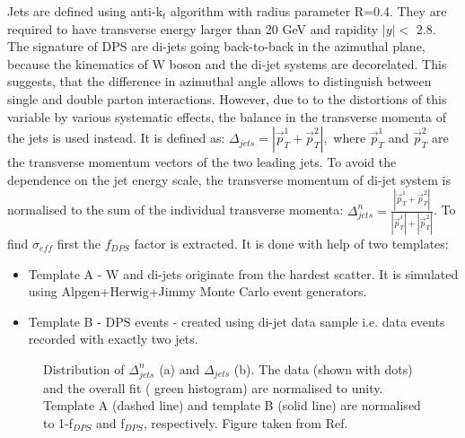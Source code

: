 \documentclass{ws-rv9x6}
\begin{document}
Jets are defined using anti-k$_t$ algorithm with radius parameter R=0.4. They are required to have transverse energy larger than 20 GeV and rapidity $|y| < $ 2.8. 
The signature of DPS are di-jets going back-to-back in the azimuthal plane, because the kinematics of W boson and the di-jet systems are decorelated. This suggests, that  the difference in azimuthal angle allows to distinguish between single and double parton interactions. However, due to to the distortions of this variable by various systematic effects, the balance in the transverse momenta of the jets is used instead. 
It is defined as:
$\Delta_{jets} = |\vec{p}_T^1 + \vec{p}_T^2|,$
where $\vec{p}_T^1$ and $ \vec{p}_T^2 $ are the transverse momentum vectors of the two leading jets.
To avoid the dependence on the jet energy scale, the transverse momentum of di-jet system is normalised to the sum of the individual transverse momenta:
$\Delta^n_{jets} = \frac{|\vec{p}_T^1 + \vec{p}_T^2|}{|\vec{p}_T^1| + |\vec{p}_T^2|}$.
To find $\sigma_{e\!f\!f}$ first the $f_{D\!P\!S}$ factor is extracted. It is done with help of two templates:
\begin{itemize}
\item Template A - W and di-jets originate from the hardest scatter. It is simulated using Alpgen+Herwig+Jimmy \cite{aahj,ahhj,ahjj} Monte Carlo event generators.
\item Template B - DPS events - created using di-jet data sample i.e. data events recorded with exactly two jets.
\end{itemize}
\begin{figure}[ht]
\centerline{
  \hspace*{4pt}
}
\caption{Distribution of $\Delta^n_{jets}$ (a) and $\Delta_{jets}$ (b). The data (shown with dots) and the overall fit ( green histogram) are normalised to unity. Template A (dashed line) and template B (solid line) are normalised to 1-f$_{D\!P\!S}$ and f$_{D\!P\!S}$, respectively. Figure taken from Ref.~} \label{Delta} %
\end{figure}
\end{document}
